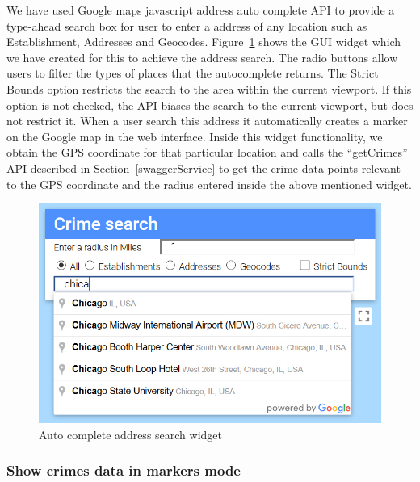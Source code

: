 We have used Google maps javascript address auto complete API to
provide a type-ahead search box for user to enter a address of any
location such as Establishment, Addresses and
Geocodes. Figure~\ref{fig:gui-addressSeach} shows the GUI widget which
we have created for this to achieve the address search. The radio
buttons allow users to filter the types of places that the
autocomplete returns. The Strict Bounds option restricts the search to
the area within the current viewport. If this option is not checked,
the API biases the search to the current viewport, but does not
restrict it.  When a user search this address it automatically creates a
marker on the Google map in the web interface. Inside this widget
functionality, we obtain the GPS coordinate for that particular
location and calls the ``getCrimes'' API described in
Section~\ref{swaggerService} to get the crime data points relevant to
the GPS coordinate and the radius entered inside the above mentioned
widget.

\begin{figure}[htb]
	\centering\includegraphics[width=\columnwidth]
        {images/addressSeach.jpg}
	\caption{Auto complete address search
        widget}\label{fig:gui-addressSeach}
\end{figure}

\subsubsection{Show crimes data in markers mode}\label{markerMode}

